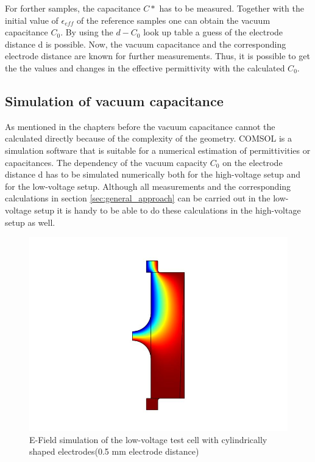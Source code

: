 For forther samples, the capacitance $C*$ has to be measured. Together with the initial value of $\epsilon_{eff}$ of the reference samples one can obtain the vacuum capacitance $C_0$. By using the $d-C_0$ look up table a guess of the electrode distance d is possible. Now, the vacuum capacitance and the corresponding electrode distance are known for further measurements. Thus, it is possible to get the the values and changes in the effective permittivity with the calculated $C_0$.

\subsection{Simulation of vacuum capacitance} 
\label{sec.sim_vac_comsol}
As mentioned in the chapters before the vacuum capacitance cannot the calculated directly because of the complexity of the geometry. COMSOL is a simulation software that is suitable for a numerical estimation of permittivities or capacitances. The dependency of the vacuum capacity $C_0$ on the electrode distance d has to be simulated numerically both for the high-voltage setup and for the low-voltage setup. Although all measurements and the corresponding calculations in section \ref{sec:general_approach} can be carried out in the low-voltage setup it is handy to be able to do these calculations in the high-voltage setup as well. 


\begin{figure}[htbp]
	\centering
	\includegraphics{figures/COMSOL_Beispielbild.jpg}		
	\caption[Kurze Abbildungsbeschreibung]{E-Field simulation of the low-voltage test cell with cylindrically shaped electrodes(0.5 mm electrode distance)} \label{fig.comsol_beispiel}

\end{figure}
 
